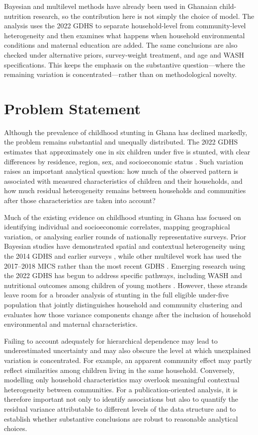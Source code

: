 Bayesian and multilevel methods have already been used in Ghanaian child-nutrition research, so the contribution here is not simply the choice of model. The analysis uses the 2022 GDHS to separate household-level from community-level heterogeneity and then examines what happens when household environmental conditions and maternal education are added. The same conclusions are also checked under alternative priors, survey-weight treatment, and age and WASH specifications. This keeps the emphasis on the substantive question---where the remaining variation is concentrated---rather than on methodological novelty.

\section{Problem Statement}

Although the prevalence of childhood stunting in Ghana has declined markedly, the problem remains substantial and unequally distributed. The 2022 GDHS estimates that approximately one in six children under five is stunted, with clear differences by residence, region, sex, and socioeconomic status \cite{GSSICF2024}. Such variation raises an important analytical question: how much of the observed pattern is associated with measured characteristics of children and their households, and how much residual heterogeneity remains between households and communities after those characteristics are taken into account?

Much of the existing evidence on childhood stunting in Ghana has focused on identifying individual and socioeconomic correlates, mapping geographical variation, or analysing earlier rounds of nationally representative surveys. Prior Bayesian studies have demonstrated spatial and contextual heterogeneity using the 2014 GDHS and earlier surveys \cite{AhetoDagne2021,AmoakoJohnson2022}, while other multilevel work has used the 2017--2018 MICS rather than the most recent GDHS \cite{IddrisuGyabaah2023}. Emerging research using the 2022 GDHS has begun to address specific pathways, including WASH and nutritional outcomes among children of young mothers \cite{OgumEtAl2026}. However, these strands leave room for a broader analysis of stunting in the full eligible under-five population that jointly distinguishes household and community clustering and evaluates how those variance components change after the inclusion of household environmental and maternal characteristics.

Failing to account adequately for hierarchical dependence may lead to underestimated uncertainty and may also obscure the level at which unexplained variation is concentrated. For example, an apparent community effect may partly reflect similarities among children living in the same household. Conversely, modelling only household characteristics may overlook meaningful contextual heterogeneity between communities. For a publication-oriented analysis, it is therefore important not only to identify associations but also to quantify the residual variance attributable to different levels of the data structure and to establish whether substantive conclusions are robust to reasonable analytical choices.

